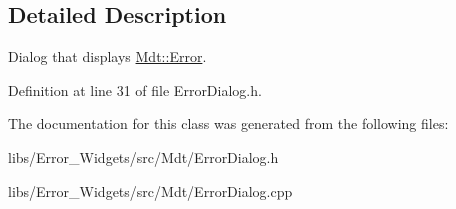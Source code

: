 \subsection{Detailed Description}
Dialog that displays \hyperlink{class_mdt_1_1_error}{Mdt\+::\+Error}. 

Definition at line 31 of file Error\+Dialog.\+h.



The documentation for this class was generated from the following files\+:\begin{DoxyCompactItemize}
\item 
libs/\+Error\+\_\+\+Widgets/src/\+Mdt/Error\+Dialog.\+h\item 
libs/\+Error\+\_\+\+Widgets/src/\+Mdt/Error\+Dialog.\+cpp\end{DoxyCompactItemize}
